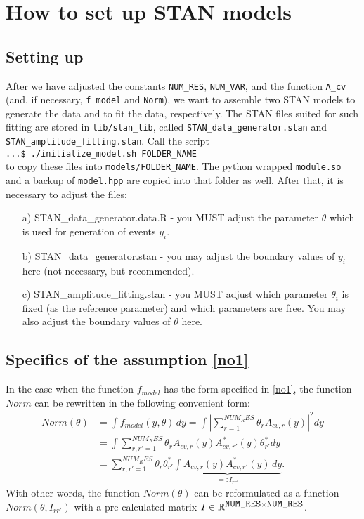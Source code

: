 \documentclass[a4paper]{article}
\begin{document}
\section{How to set up STAN models}
\subsection{Setting up}\label{setting_up}
After we have adjusted the constants \texttt{NUM\_RES}, \texttt{NUM\_VAR}, and the function \texttt{A\_cv} (and, if necessary, \texttt{f\_model} and \texttt{Norm}), we want to assemble two STAN models to generate the data and to fit the data, respectively. The STAN
files suited for such fitting are stored in \texttt{lib/stan\_lib}, called \texttt{STAN\_data\_generator.stan} and 
\texttt{STAN\_amplitude\_fitting.stan}. Call the script
\texttt{
\quad\\
\qquad ...\$ ./initialize\_model.sh FOLDER\_NAME 
}
\quad\\
to copy these files into \texttt{models/FOLDER\_NAME}. The python wrapped \texttt{module.so} and a backup of \texttt{model.hpp} are copied into that folder as well. After that, it is necessary to adjust the files:
\begin{itemize}
\item[a)] STAN\_data\_generator.data.R - you MUST adjust the parameter $\theta$ which is used for generation of events $y_i$.
\item[b)] STAN\_data\_generator.stan - you may adjust the boundary values of $y_i$ here (not necessary, but recommended).
\item[c)] STAN\_amplitude\_fitting.stan - you MUST adjust which parameter $\theta_i$ is fixed (as the reference parameter) and which parameters are free. You may also adjust the boundary values of $\theta$ here.
\end{itemize}

\subsection{Specifics of the assumption \eqref{no1}}
In the case when the function $f_{model}$ has the form specified in \eqref{no1}, the function
$Norm$ can be rewritten in the following convenient form:
\begin{align}
Norm(\theta) &= \int f_{model}(y,\theta)\, dy = \int |\sum_{r=1}^{NUM_RES} \theta_r A_{cv,r}(y)|^2 dy \\
&= \int \sum_{r,r'=1}^{NUM_RES} \theta_r A_{cv,r}(y) A^*_{cv,r'}(y) \theta^*_{r'} dy \\
&= \sum_{r,r'=1}^{NUM_RES} \theta_r \theta^*_{r'} \underbrace{\int A_{cv,r}(y) A^*_{cv,r'}(y)\, dy}_{=:I_{rr'}}.\label{integrals}
\end{align}
With other words, the function $Norm(\theta)$ can be reformulated as a function $Norm(\theta, I_{rr'})$ with a
pre-calculated matrix $I\in\mathbb R^{\mbox{\texttt{NUM\_RES}}\times \mbox{\texttt{NUM\_RES}}}$.
\end{document}

